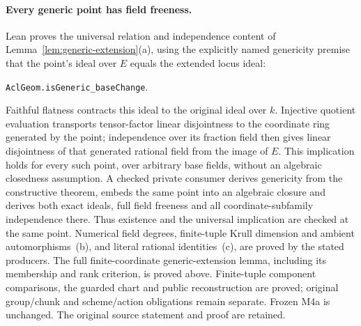 \documentclass[11pt,oneside]{article}
\theoremstyle{definition}
\theoremstyle{remark}
\begin{document}
\clearpage
\paragraph{Every generic point has field freeness.}
Lean proves the universal relation and independence content of
Lemma~\ref{lem:generic-extension}(a), using the explicitly named genericity
premise that the point's ideal over $E$ equals the extended locus ideal:
\par\noindent
\texttt{AclGeom.isGeneric\_baseChange}.
\par\noindent
Faithful flatness contracts this ideal to the original ideal over $k$.
Injective quotient evaluation transports tensor-factor linear disjointness
to the coordinate ring generated by the point; independence over its
fraction field then gives linear disjointness of that generated rational
field from the image of $E$. This implication holds for every such point,
over arbitrary base fields, without an algebraic closedness assumption.
A checked private consumer derives genericity from the constructive theorem,
embeds the same point into an algebraic closure and derives both exact
ideals, full field freeness and all coordinate-subfamily independence there.
Thus existence and the universal implication are checked at the same point.
Numerical field degrees, finite-tuple Krull dimension and ambient
automorphisms~(b), and literal rational identities~(c), are proved by the
stated producers. The full finite-coordinate generic-extension lemma,
including its membership and rank criterion, is proved above. Finite-tuple
component comparisons, the guarded chart and public reconstruction are
proved; original group/chunk and scheme/action obligations remain separate.
Frozen M4a is unchanged. The original source statement and proof are retained.

\clearpage
\end{document}
